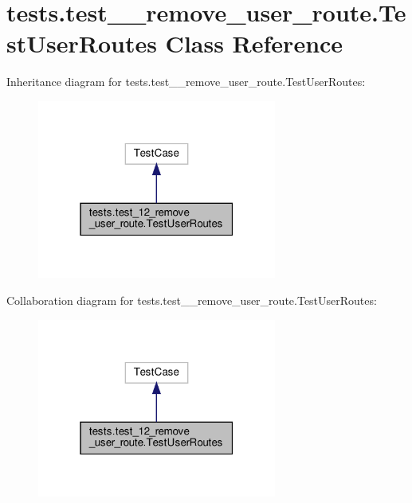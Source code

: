 \hypertarget{classtests_1_1test__12__remove__user__route_1_1_test_user_routes}{}\section{tests.\+test\+\_\+\_\+remove\+\_\+user\+\_\+route.\+Test\+User\+Routes Class Reference}
\label{classtests_1_1test__12__remove__user__route_1_1_test_user_routes}


Inheritance diagram for tests.\+test\+\_\+\_\+remove\+\_\+user\+\_\+route.\+Test\+User\+Routes\+:
\nopagebreak
\begin{figure}[H]
\begin{center}
\leavevmode
\includegraphics[width=223pt]{classtests_1_1test__12__remove__user__route_1_1_test_user_routes__inherit__graph}
\end{center}
\end{figure}


Collaboration diagram for tests.\+test\+\_\+\_\+remove\+\_\+user\+\_\+route.\+Test\+User\+Routes\+:
\nopagebreak
\begin{figure}[H]
\begin{center}
\leavevmode
\includegraphics[width=223pt]{classtests_1_1test__12__remove__user__route_1_1_test_user_routes__coll__graph}
\end{center}
\end{figure}
